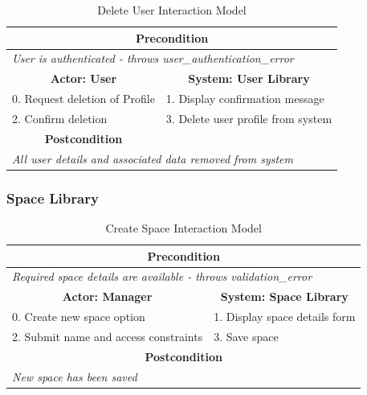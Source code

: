 \begin{table}[H]
\centering
\begin{tabular}{|l|l|}
\hline
\multicolumn{2}{|c|}{\textbf{Precondition}}                                       \\ \hline
\multicolumn{2}{|l|}{\textit{User is authenticated - throws user\_authentication\_error}}       \\ \hline
\multicolumn{1}{|c|}{\textbf{Actor: User}} & \multicolumn{1}{c|}{\textbf{System: User Library}} \\ \hline
0. Request deletion of Profile               & 1. Display confirmation message    \\ \hline
2. Confirm deletion                          & 3. Delete user profile from system \\ \hline
\multicolumn{1}{|c|}{\textbf{Postcondition}} &                                    \\ \hline
\multicolumn{2}{|l|}{\textit{All user details and associated data removed from system}}         \\ \hline
\end{tabular}
\caption{Delete User Interaction Model}
\label{tab:delete_user_interaction}
\end{table}

\subsubsection{Space Library}

\begin{table}[H]
\centering
\begin{tabular}{|l|l|}
\hline
\multicolumn{2}{|c|}{\textbf{Precondition}}                                           \\ \hline
\multicolumn{2}{|l|}{\textit{Required space details are available - throws validation\_error}} \\ \hline
\multicolumn{1}{|c|}{\textbf{Actor: Manager}} & \multicolumn{1}{c|}{\textbf{System: Space Library}} \\ \hline
0. Create new space option        & 1. Display space details form           \\ \hline
2. Submit name and access constraints & 3. Save space \\ \hline
\multicolumn{2}{|c|}{\textbf{Postcondition}}                                          \\ \hline
\multicolumn{2}{|l|}{\textit{New space has been saved}}                                        \\ \hline
\end{tabular}
\caption{Create Space Interaction Model}
\label{tab:create_space_interaction}
\end{table}

